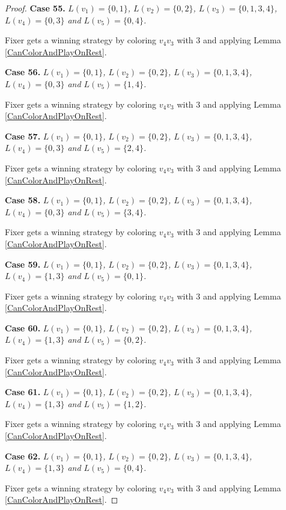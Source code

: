 \documentclass[12pt]{amsart}
\theoremstyle{plain}
\theoremstyle{definition}
\theoremstyle{remark}
\begin{document}
\begin{proof}
\noindent\textbf{Case 55.  }\textit{$L(v_1) = \{0, 1\}$, $L(v_2) = \{0, 2\}$, $L(v_3) = \{0, 1, 3, 4\}$, $L(v_4) = \{0, 3\}$ and $L(v_5) = \{0, 4\}$.}

Fixer gets a winning strategy by coloring $v_4v_3$ with $3$ and applying Lemma \ref{CanColorAndPlayOnRest}.

\noindent\textbf{Case 56.  }\textit{$L(v_1) = \{0, 1\}$, $L(v_2) = \{0, 2\}$, $L(v_3) = \{0, 1, 3, 4\}$, $L(v_4) = \{0, 3\}$ and $L(v_5) = \{1, 4\}$.}

Fixer gets a winning strategy by coloring $v_4v_3$ with $3$ and applying Lemma \ref{CanColorAndPlayOnRest}.

\noindent\textbf{Case 57.  }\textit{$L(v_1) = \{0, 1\}$, $L(v_2) = \{0, 2\}$, $L(v_3) = \{0, 1, 3, 4\}$, $L(v_4) = \{0, 3\}$ and $L(v_5) = \{2, 4\}$.}

Fixer gets a winning strategy by coloring $v_4v_3$ with $3$ and applying Lemma \ref{CanColorAndPlayOnRest}.

\noindent\textbf{Case 58.  }\textit{$L(v_1) = \{0, 1\}$, $L(v_2) = \{0, 2\}$, $L(v_3) = \{0, 1, 3, 4\}$, $L(v_4) = \{0, 3\}$ and $L(v_5) = \{3, 4\}$.}

Fixer gets a winning strategy by coloring $v_4v_3$ with $3$ and applying Lemma \ref{CanColorAndPlayOnRest}.

\noindent\textbf{Case 59.  }\textit{$L(v_1) = \{0, 1\}$, $L(v_2) = \{0, 2\}$, $L(v_3) = \{0, 1, 3, 4\}$, $L(v_4) = \{1, 3\}$ and $L(v_5) = \{0, 1\}$.}

Fixer gets a winning strategy by coloring $v_4v_3$ with $3$ and applying Lemma \ref{CanColorAndPlayOnRest}.

\noindent\textbf{Case 60.  }\textit{$L(v_1) = \{0, 1\}$, $L(v_2) = \{0, 2\}$, $L(v_3) = \{0, 1, 3, 4\}$, $L(v_4) = \{1, 3\}$ and $L(v_5) = \{0, 2\}$.}

Fixer gets a winning strategy by coloring $v_4v_3$ with $3$ and applying Lemma \ref{CanColorAndPlayOnRest}.

\noindent\textbf{Case 61.  }\textit{$L(v_1) = \{0, 1\}$, $L(v_2) = \{0, 2\}$, $L(v_3) = \{0, 1, 3, 4\}$, $L(v_4) = \{1, 3\}$ and $L(v_5) = \{1, 2\}$.}

Fixer gets a winning strategy by coloring $v_4v_3$ with $3$ and applying Lemma \ref{CanColorAndPlayOnRest}.

\noindent\textbf{Case 62.  }\textit{$L(v_1) = \{0, 1\}$, $L(v_2) = \{0, 2\}$, $L(v_3) = \{0, 1, 3, 4\}$, $L(v_4) = \{1, 3\}$ and $L(v_5) = \{0, 4\}$.}

Fixer gets a winning strategy by coloring $v_4v_3$ with $3$ and applying Lemma \ref{CanColorAndPlayOnRest}.


\end{proof}
\end{document}
